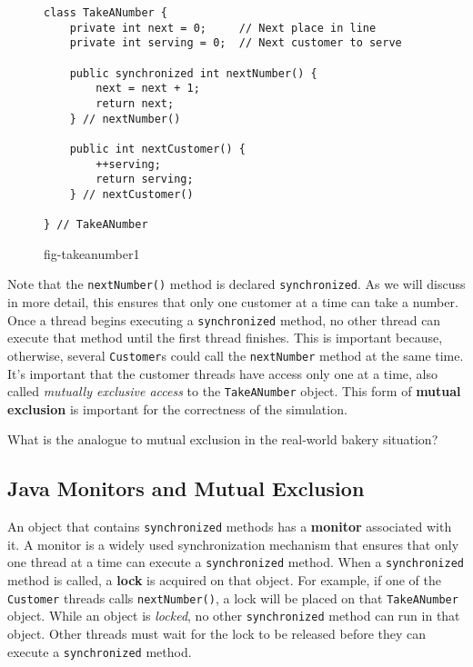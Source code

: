 \begin{figure}[h]
\jjjprogstart
\begin{jjjlisting}
\begin{lstlisting}
class TakeANumber {
    private int next = 0;     // Next place in line
    private int serving = 0;  // Next customer to serve

    public synchronized int nextNumber() {
        next = next + 1;
        return next;
    } // nextNumber()

    public int nextCustomer() {
        ++serving;
        return serving;
    } // nextCustomer()

} // TakeANumber
\end{lstlisting}
\end{jjjlisting}
{fig-takeanumber1}
\end{figure}

Note that the {\tt nextNumber()} method is declared
{\tt synchronized}.  As we will discuss in more detail, this ensures that
only one customer at a time can take a number.   Once a thread begins
executing a {\tt synchronized} method, no other thread can execute that
method until the first thread finishes.
 This is important because,
otherwise, several {\tt Customer}s could call the {\tt nextNumber}
method at the same time.  It's important that the customer threads
have access only one at a time, also called {\em mutually exclusive
access} to the {\tt TakeANumber} object.  This form of {\bf mutual
exclusion} is important for the correctness of
the simulation.

\begin{SSTUDY}

\item What is the analogue to mutual
exclusion in the real-world bakery situation?
\end{SSTUDY}

\subsection{Java Monitors and Mutual Exclusion}
\noindent An object that contains {\tt synchronized} methods has a {\bf monitor}
associated with it.  A monitor is a widely used synchronization
mechanism that ensures that only one thread at a time can execute a
{\tt synchronized} method.   When a {\tt synchronized} method is
called, a {\bf lock} is acquired on that object.  For example, if one
of the {\tt Customer} threads calls {\tt nextNumber()}, a lock will be
placed on that {\tt TakeANumber} object.   While an object is {\it
locked}, no other {\tt synchronized} method can run in that
object.  Other threads must wait for the lock to be released before
they can execute a {\tt synchronized} method.

